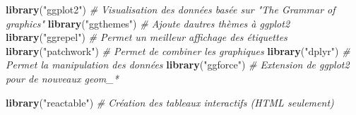 \documentclass[
  french,
]{book}
\newenvironment{Shaded}{\begin{snugshade}}{\end{snugshade}}
\newcommand{\CommentTok}[1]{\textcolor[rgb]{0.56,0.35,0.01}{\textit{#1}}}
\newcommand{\KeywordTok}[1]{\textcolor[rgb]{0.13,0.29,0.53}{\textbf{#1}}}
\newcommand{\NormalTok}[1]{#1}
\newcommand{\StringTok}[1]{\textcolor[rgb]{0.31,0.60,0.02}{#1}}
\begin{document}
\begin{Shaded}
\begin{Highlighting}[]
\KeywordTok{library}\NormalTok{(}\StringTok{"ggplot2"}\NormalTok{)   }\CommentTok{\# Visualisation des données basée sur "The Grammar of graphics"}
\KeywordTok{library}\NormalTok{(}\StringTok{"ggthemes"}\NormalTok{)  }\CommentTok{\# Ajoute d\textquotesingle{}autres thèmes à ggplot2}
\KeywordTok{library}\NormalTok{(}\StringTok{"ggrepel"}\NormalTok{)   }\CommentTok{\# Permet un meilleur affichage des étiquettes}
\KeywordTok{library}\NormalTok{(}\StringTok{"patchwork"}\NormalTok{) }\CommentTok{\# Permet de combiner les graphiques}
\KeywordTok{library}\NormalTok{(}\StringTok{"dplyr"}\NormalTok{)     }\CommentTok{\# Permet la manipulation des données}
\KeywordTok{library}\NormalTok{(}\StringTok{"ggforce"}\NormalTok{)   }\CommentTok{\# Extension de ggplot2 pour de nouveaux geom\_*}

\KeywordTok{library}\NormalTok{(}\StringTok{"reactable"}\NormalTok{) }\CommentTok{\# Création des tableaux interactifs (HTML seulement)}
\end{Highlighting}
\end{Shaded}
\end{document}

